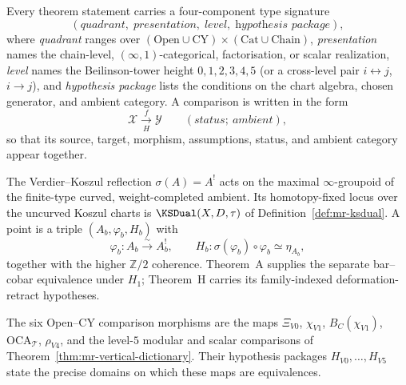 \begin{convention}
\label{conv:master-type-signature}
Every theorem statement carries a four-component type signature
\[
(\textit{quadrant},\;\textit{presentation},\;\textit{level},\;
\textit{hypothesis package}),
\]
where \emph{quadrant} ranges over
$(\mathrm{Open}\cup\mathrm{CY})\times(\mathrm{Cat}\cup\mathrm{Chain})$,
\emph{presentation} names the chain-level, $(\infty,1)$-categorical,
factorisation, or scalar realization,
\emph{level} names the Beilinson-tower height
$0,1,2,3,4,5$ (or a cross-level pair $i\leftrightarrow j$, $i\to j$),
and \emph{hypothesis package} lists the conditions on the chart
algebra, chosen generator, and ambient category.  A comparison is
written in the form
\[
 \mathcal X\xrightarrow[H]{\ f\ }\mathcal Y
 \qquad(\textit{status};\ \textit{ambient}),
\]
so that its source, target, morphism, assumptions, status, and ambient
category appear together.

The Verdier--Koszul reflection
$\sigma(A)=A^!$ acts on the maximal $\infty$-groupoid of the
finite-type curved, weight-completed ambient.  Its homotopy-fixed locus
over the uncurved Koszul charts is
$\KSDual(X,D,\tau)$ of Definition~\ref{def:mr-ksdual}.  A point is a
triple $(A_b,\varphi_b,H_b)$ with
\[
 \varphi_b\colon A_b\xrightarrow{\sim}A_b^!,
 \qquad
 H_b\colon\sigma(\varphi_b)\circ\varphi_b\simeq\eta_{A_b},
\]
together with the higher $\mathbb Z/2$ coherence.  Theorem~A supplies
the separate bar--cobar equivalence under $H_1$; Theorem~H carries its
family-indexed deformation-retract hypotheses.

The six Open--CY comparison morphisms are the maps
$\Xi_{V0}$, $\chi_{V1}$, $B_C(\chi_{V1})$,
$\mathrm{OCA}_{\mathcal T}$, $\rho_{V4}$, and the level-$5$ modular
and scalar comparisons of
Theorem~\ref{thm:mr-vertical-dictionary}.  Their hypothesis packages
$H_{V0},\ldots,H_{V5}$ state the precise domains on which these maps
are equivalences.
\end{convention}

